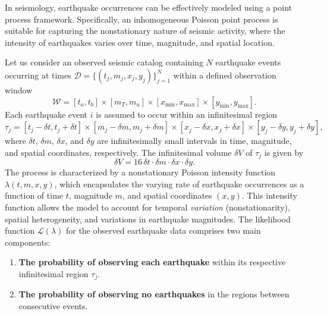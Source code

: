 \documentclass[linenum,doublespace,onecolumn]{SSA-SRL}
\theoremstyle{lemma}
\begin{document}
In seismology, earthquake occurrences can be effectively modeled using a point process framework. Specifically, an inhomogeneous Poisson point process is suitable for capturing the nonstationary nature of seismic activity, where the intensity of earthquakes varies over time, magnitude, and spatial location.

Let us consider an observed seismic catalog containing \( N \) earthquake events occurring at times \( \mathcal{D} = \{(t_j, m_j, x_j, y_j)\}_{j=1}^N \) within a defined observation window
\[
\mathcal{W} = [t_a, t_b] \times [m_T, m_u] \times [x_{\text{min}}, x_{\text{max}}] \times [y_{\text{min}}, y_{\text{max}}].
\]
Each earthquake event \( i \) is assumed to occur within an infinitesimal region
\[
\tau_j = [t_j - \delta t, t_j + \delta t] \times [m_j - \delta m, m_j + \delta m] \times [x_j - \delta x, x_j + \delta x] \times [y_j - \delta y, y_j + \delta y],
\]
where \( \delta t \), \( \delta m \), \( \delta x \), and \( \delta y \) are infinitesimally small intervals in time, magnitude, and spatial coordinates, respectively. The infinitesimal volume \( \delta V \) of \( \tau_j \) is given by
\[
\delta V = 16 \,\delta t \cdot \delta m \cdot \delta x \cdot \delta y.
\]
The process is characterized by a nonstationary Poisson intensity function \( \lambda(t, m, x, y) \), which encapsulates the varying rate of earthquake occurrences as a function of time \( t \), magnitude \( m \), and spatial coordinates \( (x, y) \). This intensity function allows the model to account for temporal \textit{variation} (nonstationarity), spatial heterogeneity, and variations in earthquake magnitudes. The likelihood function \( \mathcal{L}(\lambda) \) for the observed earthquake data comprises two main components:
\begin{enumerate}
    \item \textbf{The probability of observing each earthquake} within its respective infinitesimal region \( \tau_j \).
    \item \textbf{The probability of observing no earthquakes} in the regions between consecutive events.
\end{enumerate}
\end{document}
